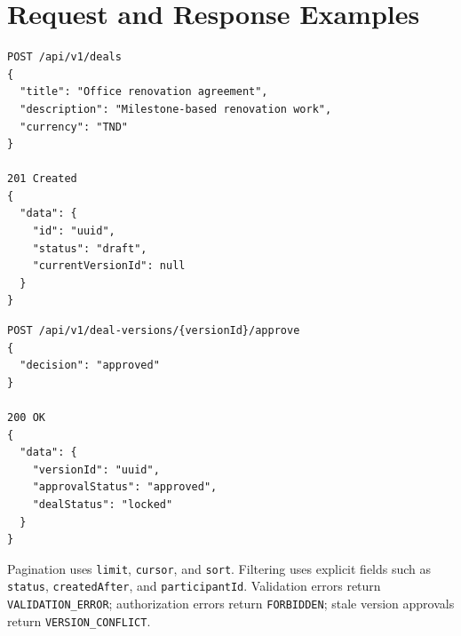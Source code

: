 \section{Request and Response Examples}
\begin{lstlisting}
POST /api/v1/deals
{
  "title": "Office renovation agreement",
  "description": "Milestone-based renovation work",
  "currency": "TND"
}

201 Created
{
  "data": {
    "id": "uuid",
    "status": "draft",
    "currentVersionId": null
  }
}
\end{lstlisting}

\begin{lstlisting}
POST /api/v1/deal-versions/{versionId}/approve
{
  "decision": "approved"
}

200 OK
{
  "data": {
    "versionId": "uuid",
    "approvalStatus": "approved",
    "dealStatus": "locked"
  }
}
\end{lstlisting}

Pagination uses \texttt{limit}, \texttt{cursor}, and \texttt{sort}. Filtering uses explicit fields such as \texttt{status}, \texttt{createdAfter}, and \texttt{participantId}. Validation errors return \texttt{VALIDATION\_ERROR}; authorization errors return \texttt{FORBIDDEN}; stale version approvals return \texttt{VERSION\_CONFLICT}.
